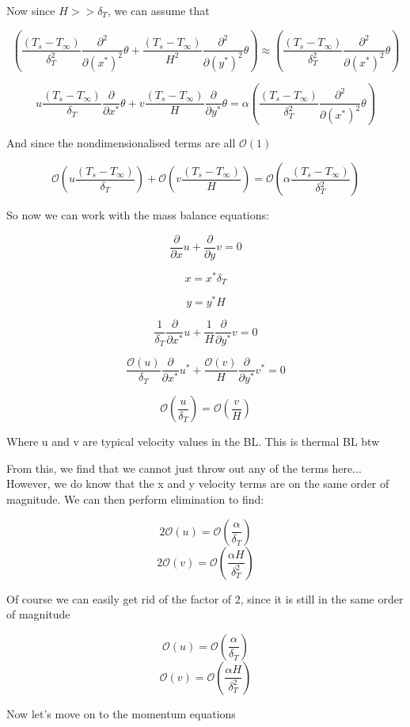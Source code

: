\documentclass[11pt]{article}
\begin{document}
Now since $H >> \delta_T$, we can assume that

$$( \frac{(T_s - T_\infty)}{\delta_T^2} \frac{\partial^2}{\partial (x^*)^2} \theta + \frac{(T_s - T_\infty)}{H^2} \frac{\partial^2 }{\partial (y^*)^2} \theta) \approx ( \frac{(T_s - T_\infty)}{\delta_T^2} \frac{\partial^2}{\partial (x^*)^2} \theta )$$

$$ u \frac{(T_s - T_\infty)}{\delta_T} \frac{\partial}{\partial x^*}\theta + v \frac{(T_s - T_\infty)}{H} \frac{\partial }{\partial y^*}  \theta  = \alpha ( \frac{(T_s - T_\infty)}{\delta_T^2} \frac{\partial^2}{\partial (x^*)^2} \theta ) $$ 

And since the nondimensionalised terms are all $\mathcal{O}(1)$

$$\mathcal{O}( u \frac{(T_s - T_\infty)}{\delta_T}) + \mathcal{O}(v \frac{(T_s - T_\infty)}{H}) = \mathcal{O}( \alpha  \frac{(T_s - T_\infty)}{\delta_T^2})$$


So now we can work with the mass balance equations:


$$  \frac{\partial}{\partial x} u +  \frac{\partial}{\partial y} v  = 0$$

$$ x = x^* \delta_T$$

$$y=y^* H$$


$$ \frac{1}{\delta_T} \frac{\partial}{\partial x^* } u + \frac{1}{H} \frac{\partial}{\partial y^*} v  = 0$$

$$ \frac{\mathcal{O}(u)}{\delta_T} \frac{\partial}{\partial x^* } u^* + \frac{\mathcal{O}(v)}{H} \frac{\partial}{\partial y^*} v^*  = 0 $$

$$\mathcal{O}(\frac{u}{\delta_T}) = \mathcal{O}(\frac{v}{H})$$

Where u and v are typical velocity values in the BL. This is thermal BL btw

From this, we find that we cannot just throw out any of the terms here... However, we do know that the x and y velocity terms are on the same order of magnitude. We can then perform elimination to find:

$$2 \mathcal{O}( u ) = \mathcal{O}(\frac{\alpha}{\delta_T})$$
$$2 \mathcal{O}(v ) = \mathcal{O}( \frac{\alpha H}{\delta_T^2})$$

Of course we can easily get rid of the factor of 2, since it is still in the same order of magnitude


$$ \mathcal{O}( u ) = \mathcal{O}(\frac{\alpha}{\delta_T})$$
$$ \mathcal{O}(v ) = \mathcal{O}( \frac{\alpha H}{\delta_T^2})$$

Now let's move on to the momentum equations
\end{document}
